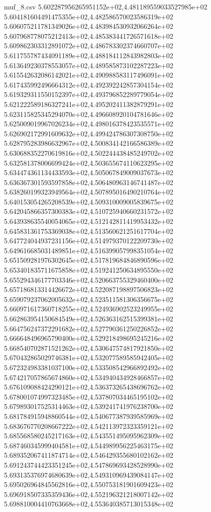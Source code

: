 \begin{filecontents*}{muf_8.csv}
5.602287956265951152e+02,4.481189559033527985e+02
5.604181604491475355e+02,4.482586570023586319e+02
5.606075211781349026e+02,4.483984530932066264e+02
5.607968778075212413e+02,4.485383441726571618e+02
5.609862303312891072e+02,4.486783302374660707e+02
5.611755787434091189e+02,4.488184112843982803e+02
5.613649230378553057e+02,4.489585873102287223e+02
5.615542632086142021e+02,4.490988583117496091e+02
5.617435992496664312e+02,4.492392242857304154e+02
5.619329311550152397e+02,4.493796852289779054e+02
5.621222589186327241e+02,4.495202411382879291e+02
5.623115825345294070e+02,4.496608920104781646e+02
5.625009019967026234e+02,4.498016378423535571e+02
5.626902172991609632e+02,4.499424786307308750e+02
5.628795283986632967e+02,4.500834142166586389e+02
5.630688352270619816e+02,4.502244438485249702e+02
5.632581378006699424e+02,4.503655674110623295e+02
5.634474361134433593e+02,4.505067849009037673e+02
5.636367301593597858e+02,4.506480963146741487e+02
5.638260199323949564e+02,4.507895016490210764e+02
5.640153054265208539e+02,4.509310009005839675e+02
5.642045866357300383e+02,4.510725940660231572e+02
5.643938635540054065e+02,4.512142811419953432e+02
5.645831361753369038e+02,4.513560621251617704e+02
5.647724044937231156e+02,4.514979370122209730e+02
5.649616685031489851e+02,4.516399057998351054e+02
5.651509281976302645e+02,4.517819684846890596e+02
5.653401835711675858e+02,4.519241250634895550e+02
5.655294346177703346e+02,4.520663755329460400e+02
5.657186813314426672e+02,4.522087198897506823e+02
5.659079237062005632e+02,4.523511581306356675e+02
5.660971617360718255e+02,4.524936902523249955e+02
5.662863954150684549e+02,4.526363162515399381e+02
5.664756247372291682e+02,4.527790361250226852e+02
5.666648496965790400e+02,4.529218498695245216e+02
5.668540702871521262e+02,4.530647574817921850e+02
5.670432865029746381e+02,4.532077589585942405e+02
5.672324983381037100e+02,4.533508542966892492e+02
5.674217057865674860e+02,4.534940434928466857e+02
5.676109088424290121e+02,4.536373265438696762e+02
5.678001074997323485e+02,4.537807034465195102e+02
5.679893017525314463e+02,4.539241741976238700e+02
5.681784915948860544e+02,4.540677387939585969e+02
5.683676770208667222e+02,4.542113972323359121e+02
5.685568580245217163e+02,4.543551495095962309e+02
5.687460345999404581e+02,4.544989956225463175e+02
5.689352067411874714e+02,4.546429355680102162e+02
5.691243744423351245e+02,4.547869693428528990e+02
5.693135376974680639e+02,4.549310969439084147e+02
5.695026964845562816e+02,4.550753181901609423e+02
5.696918507335359436e+02,4.552196321218007142e+02
5.698810004410763668e+02,4.553640385713015348e+02

\end{filecontents*}
